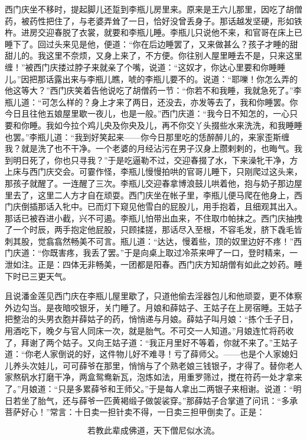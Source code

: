 西门庆坐不移时，提起脚儿还踅到李瓶儿房里来。原来是王六儿那里，因吃了胡僧药，被药性把住了，与老婆弄耸了一日，恰好没曾丢身子。那话越发坚硬，形如铁杵。进房交迎春脱了衣裳，就要和李瓶儿睡。李瓶儿只说他不来，和官哥在床上已睡下了。回过头来见是他，便道：“你在后边睡罢了，又来做甚么？孩子才睡的甜甜儿的。我这里不奈烦，又身上来了，不方便。你往别人屋里睡去不是，只来这里缠！”被西门庆搂过脖子来就亲了个嘴，说道：“这奴才，你达心里要和你睡睡儿。”因把那话露出来与李瓶儿瞧，唬的李瓶儿要不的。说道：“耶嚛！你怎么弄的他这等大？”西门庆笑着告他说吃了胡僧药一节：“你若不和我睡，我就急死了。”李瓶儿道：“可怎么样的？身上才来了两日，还没去，亦发等去了，我和你睡罢。你今日且往他五娘屋里歇一夜儿，也是一般。”西门庆道：“我今日不知怎的，一心只要和你睡。我如今拉个鸡儿央及你央及儿，再不你交丫头掇些水来洗洗，和我睡睡也罢。”李瓶儿道：“我到好笑起来——你今日那里吃的恁醉醉儿的，来家歪斯缠我？就是洗了也不干净。一个老婆的月经沾污在男子汉身上臜剌剌的，也晦气。我到明日死了，你也只寻我？”于是吃逼勒不过，交迎春掇了水，下来澡牝干净，方上床与西门庆交会。可霎作怪，李瓶儿慢慢拍哄的官哥儿睡下，只刚爬过这头来，那孩子就醒了。一连醒了三次。李瓶儿交迎春拿博浪鼓儿哄着他，抱与奶子那边屋里去了，这里二人方才自在顽耍。西门庆坐在帐子里，李瓶儿便马爬在他身上，西门庆倒插那话入牝中。已而灯下窥见他雪白的屁股儿，用手抱着，且细观其出入。那话已被吞进小截，兴不可遏。李瓶儿怕带出血来，不住取巾帕抹之。西门庆抽拽了一个时辰，两手抱定他屁股，只顾揉搓，那话尽入至根，不容毛发，脐下毳毛皆刺其股，觉翕翕然畅美不可言。瓶儿道：“达达，慢着些，顶的奴里边好不疼！”西门庆道：“你既害疼，我丢了罢。”于是向桌上取过冷茶来呷了一口，登时精来，一泄如注。正是：四体无非畅美，一团都是阳春。西门庆方知胡僧有如此之妙药。睡下时已三更天气。

且说潘金莲见西门庆在李瓶儿屋里歇了，只道他偷去淫器包儿和他顽耍，更不体察外边勾当。是夜暗咬银牙，关门睡了。月娘和薛姑子、王姑子在上房宿睡。王姑子把整治的头男衣胞并薛姑子的药，悄悄递与月娘。薛姑子叫月娘：“拣个壬子日，用酒吃下，晚夕与官人同床一次，就是胎气。不可交一人知道。”月娘连忙将药收了，拜谢了两个姑子。又向王姑子道：“我正月里好不等着，你就不来了。”王姑子道：“你老人家倒说的好，这件物儿好不难寻！亏了薛师父。——也是个人家媳妇儿养头次娃儿，可可薛爷在那里，悄悄与了个熟老娘三钱银子，才得了。替你老人家熬矾水打磨干净，两盒鸳鸯新瓦，泡炼如法，用重罗筛过，搅在符药一处才拿来了。”月娘道：“只是多累薛爷和王师父。”于是每人拿出二两银子来相谢。说道：“明日若坐了胎气，还与薛爷一匹黄褐缎子做袈裟穿。”那薛姑子合掌道了问讯：“多承菩萨好心！”常言：十日卖一担针卖不得，一日卖三担甲倒卖了。正是：

\[
若教此辈成佛道，天下僧尼似水流。
\]
